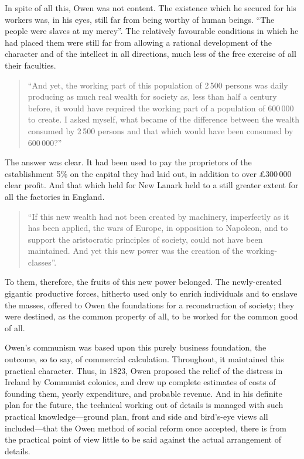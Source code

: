 In spite of all this, Owen was not content. The existence which he secured for
his workers was, in his eyes, still far from being worthy of human beings. ``The
people were slaves at my mercy''. The relatively favourable conditions in which
he had placed them were still far from allowing a rational development of the
character and of the intellect in all directions, much less of the free exercise
of all their faculties.
%
\begin{quote}
  ``And yet, the working part of this population of 2\,500 persons was daily
  producing as much real wealth for society as, less than half a century
  before, it would have required the working part of a population of 600\,000
  to create. I asked myself, what became of the difference between the wealth
  consumed by 2\,500 persons and that which would have been consumed by
  600\,000?''
\end{quote}
%
The answer was clear. It had been used to pay the proprietors of the
establishment 5\% on the capital they had laid out, in addition to over
£300\,000 clear profit. And that which held for New Lanark held to a still
greater extent for all the factories in England.
%
\begin{quote}
  ``If this new wealth had not been created by machinery, imperfectly as it has
  been applied, the wars of Europe, in opposition to Napoleon, and to support
  the aristocratic principles of society, could not have been maintained. And
  yet this new power was the creation of the working-classes''. %
\end{quote}
%
To them, therefore, the fruits of this new power belonged. The newly-created
gigantic productive forces, hitherto used only to enrich individuals and to
enslave the masses, offered to Owen the foundations for a reconstruction of
society; they were destined, as the common property of all, to be worked for the
common good of all.

Owen's communism was based upon this purely business foundation, the outcome, so
to say, of commercial calculation. Throughout, it maintained this practical
character. Thus, in 1823, Owen proposed the relief of the distress in Ireland by
Communist colonies, and drew up complete estimates of costs of founding them,
yearly expenditure, and probable revenue. And in his definite plan for the
future, the technical working out of details is managed with such practical
knowledge---ground plan, front and side and bird's-eye views all
included---that the Owen method of social reform once accepted, there is from
the practical point of view little to be said against the actual arrangement of
details.

